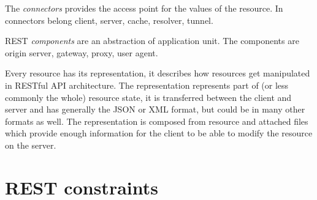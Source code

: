 The \emph{connectors} provides the access point for the values of the resource. In connectors belong client, server, cache, resolver, tunnel. %

REST \emph{components} are an abstraction of application unit. The components are origin server, gateway, proxy, user agent. %

Every resource has its representation, it describes how resources get manipulated in RESTful API architecture. The representation represents part of (or less commonly the whole) resource state, it is transferred between the client and server and has generally the JSON or XML format, but could be in many other formats as well. The representation is composed from resource and attached files which provide enough information for the client to be able to modify the resource on the server.

\section{REST constraints}
\label{sec:constraints}

